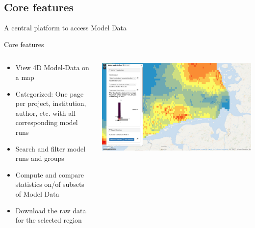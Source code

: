 \subsection*{Core features}

\begin{frame}{A central platform to access Model Data}
    \begin{block}{Core features}
        \begin{columns}
            \begin{column}{0.5\textwidth}
                \begin{itemize}
                    \item View 4D Model-Data on a map
                    \item Categorized: One page per project, institution,
                        author, etc. with all corresponding model runs
                    \item Search and filter model runs and groups
                    \item Compute and compare statistics on/of subsets of
                        Model Data
                    \item Download the raw data for the selected region
                \end{itemize}
            \end{column}
            \begin{column}{0.5\textwidth}
                \includegraphics[width=\textwidth]{figures/demo-screenshot-model-data-explorer.png}
            \end{column}
        \end{columns}
    \end{block}
\end{frame}

